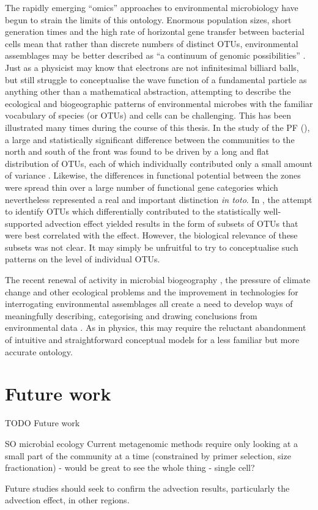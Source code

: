 The rapidly emerging ``omics'' approaches to environmental microbiology have begun to strain the limits of this ontology.
Enormous population sizes, short generation times and the high rate of horizontal gene transfer between bacterial cells mean that rather than discrete numbers of distinct \acp{OTU}, environmental assemblages may be better described as ``a continuum of genomic possibilities'' \cite{Goldenfeld:2007im}.
Just as a physicist may know that electrons are not infinitesimal billiard balls, but still struggle to conceptualise the wave function of a fundamental particle as anything other than a mathematical abstraction, attempting to describe the ecological and biogeographic patterns of environmental microbes with the familiar vocabulary of species (or \acp{OTU}) and cells can be challenging.
This has been illustrated many times during the course of this thesis.
In the study of the \ac{PF} (), a large and statistically significant difference between the communities to the north and south of the front was found to be driven by a long and flat distribution of \acp{OTU}, each of which individually contributed only a small amount of variance .
Likewise, the differences in functional potential between the zones were spread thin over a large number of functional gene categories  which nevertheless represented a real and important distinction \textit{in toto}.
In , the attempt to identify \acp{OTU} which differentially contributed to the statistically well-supported advection effect yielded results in the form of subsets of \acp{OTU} that were best correlated with the effect.
However, the biological relevance of these subsets was not clear.
It may simply be unfruitful to try to conceptualise such patterns on the level of individual \acp{OTU}.

The recent renewal of activity in microbial biogeography \cite{Ramette:2006jo}, the pressure of climate change and other ecological problems and the improvement in technologies for interrogating environmental assemblages all create a need to develop ways of meaningfully describing, categorising and drawing conclusions from environmental data \cite{Goldenfeld:2007im}.
As in physics, this may require the reluctant abandonment of intuitive and straightforward conceptual models for a less familiar but more accurate ontology.

\section{Future work}
TODO
Future work

SO microbial ecology
Current metagenomic methods require only looking at a small part of the community at a time (constrained by primer selection, size fractionation) - would be great to see the whole thing - single cell?

Future studies should seek to confirm the advection results, particularly the advection effect, in other regions.
